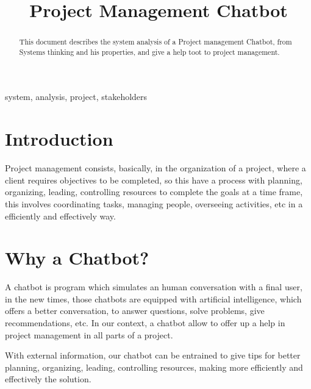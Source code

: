 \documentclass[conference]{IEEEtran}
\begin{document}
	
	\title{Project Management Chatbot}
	
	\author{
		\and
		
	}
	
	\maketitle
	
	\begin{abstract}
		This document describes the system analysis of a Project management Chatbot, from Systems thinking and his properties, and give a help toot to project management.
	\end{abstract}
	
	\begin{IEEEkeywords}
		system, analysis, project, stakeholders
	\end{IEEEkeywords}
	
	\section{Introduction}
	Project management consists, basically, in the organization of a project, where a client requires objectives to be completed, so this have a process with planning, organizing, leading, controlling resources to complete the goals at a time frame, this involves coordinating tasks, managing people, overseeing activities, etc in a efficiently and effectively way.
	
	\section{Why a Chatbot?}
	
	A chatbot is program which simulates an human conversation with a final user, in the new times, those chatbots are equipped with artificial intelligence, which offers a better conversation, to answer questions, solve problems, give recommendations, etc. In our context, a chatbot allow to offer up a help in project management in all parts of a project.
	
	With external information, our chatbot can be entrained to give tips for better planning, organizing, leading, controlling resources, making more efficiently and effectively the solution.
	
\end{document}
